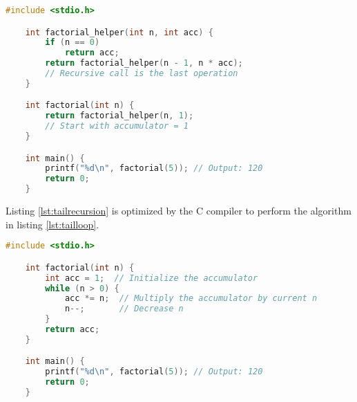 \begin{lstlisting}[language=C, caption={Tail Recursion}, label={lst:tailrecursion}]
    #include <stdio.h>

    int factorial_helper(int n, int acc) {
        if (n == 0)
            return acc;
        return factorial_helper(n - 1, n * acc);  
        // Recursive call is the last operation
    }

    int factorial(int n) {
        return factorial_helper(n, 1);  
        // Start with accumulator = 1
    }

    int main() {
        printf("%d\n", factorial(5)); // Output: 120
        return 0;
    }
\end{lstlisting}

Listing \ref{lst:tailrecursion} is optimized by the C compiler to
perform the algorithm in listing \ref{lst:tailloop}.

\begin{lstlisting}[language=C, caption={Iterative Solution}, label={lst:tailloop}]
    #include <stdio.h>

    int factorial(int n) {
        int acc = 1;  // Initialize the accumulator
        while (n > 0) {
            acc *= n;  // Multiply the accumulator by current n
            n--;       // Decrease n
        }
        return acc;
    }

    int main() {
        printf("%d\n", factorial(5)); // Output: 120
        return 0;
    }

\end{lstlisting}